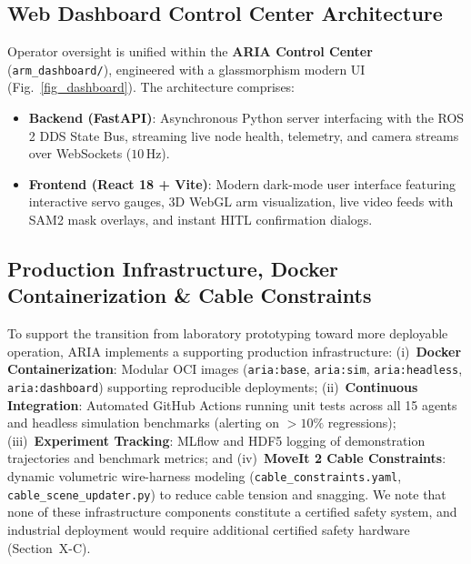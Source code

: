 \documentclass[journal]{IEEEtran}
\begin{document}
\begin{table}[!t]
\centering
\caption{Preliminary Reality-Gap Comparison on a Fixed Reference Trajectory ($n=10$ Matched Trials)}
\label{table_reality_gap}
\footnotesize
{}
\end{table}

\subsection{Web Dashboard Control Center Architecture}
Operator oversight is unified within the \textbf{ARIA Control Center} (\texttt{arm\_dashboard/}), engineered with a glassmorphism modern UI (Fig.~\ref{fig_dashboard}). The architecture comprises:
\begin{itemize}
    \item \textbf{Backend (FastAPI)}: Asynchronous Python server interfacing with the ROS 2 DDS State Bus, streaming live node health, telemetry, and camera streams over WebSockets ($10$\,Hz).
    \item \textbf{Frontend (React 18 + Vite)}: Modern dark-mode user interface featuring interactive servo gauges, 3D WebGL arm visualization, live video feeds with SAM2 mask overlays, and instant HITL confirmation dialogs.
\end{itemize}

\subsection{Production Infrastructure, Docker Containerization \& Cable Constraints}
To support the transition from laboratory prototyping toward more deployable operation, ARIA implements a supporting production infrastructure: (i)~\textbf{Docker Containerization}: Modular OCI images (\texttt{aria:base}, \texttt{aria:sim}, \texttt{aria:headless}, \texttt{aria:dashboard}) supporting reproducible deployments; (ii)~\textbf{Continuous Integration}: Automated GitHub Actions running unit tests across all 15 agents and headless simulation benchmarks (alerting on $>10\%$ regressions); (iii)~\textbf{Experiment Tracking}: MLflow and HDF5 logging of demonstration trajectories and benchmark metrics; and (iv)~\textbf{MoveIt 2 Cable Constraints}: dynamic volumetric wire-harness modeling (\texttt{cable\_constraints.yaml}, \texttt{cable\_scene\_updater.py}) to reduce cable tension and snagging. We note that none of these infrastructure components constitute a certified safety system, and industrial deployment would require additional certified safety hardware (Section~X-C).
\end{document}
